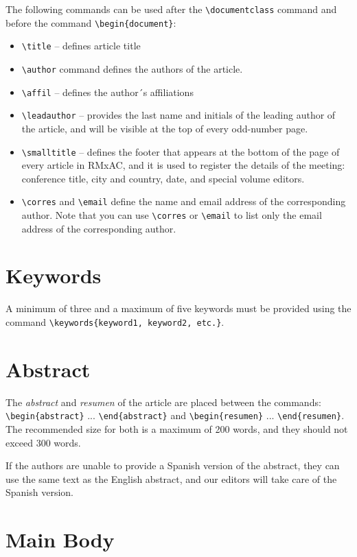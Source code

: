 \documentclass[10pt,letter,twoside]{rmat-rho}
\newcommand{\CS}[1]{\texttt{\textbackslash #1}}
\begin{document}
The following commands can be used after the \CS{documentclass} command and before the command \CS{begin}\verb|{document}|: %

\begin{itemize}
    \item \CS{title} -- defines article title
    \item \CS{author} command defines the authors of the article.
    \item \CS{affil} -- defines the author´s affiliations
    \item \CS{leadauthor} -- provides the last name and initials of the leading author of the article, and will be visible at the top of every odd-number page.
    \item \CS{smalltitle} -- defines the footer that appears at the bottom of the page of every article in RMxAC, and it is used to register the details of the meeting: conference title, city and country, date, and special volume editors.
    \item \CS{corres} and \CS{email} define the name and email address of the corresponding author. Note that you can use \CS{corres} or \CS{email} to list only the email address of the corresponding author.
\end{itemize}

\section{Keywords}

A minimum of three and a maximum of five keywords must be provided using the command \verb|\keywords{keyword1, keyword2, etc.}|. 


\section{Abstract}

The {\it abstract} and {\it resumen} of the article are placed between the commands: \CS{begin}\verb|{abstract}| ... \CS{end}\verb|{abstract}| and \CS{begin}\verb|{resumen}| ... \CS{end}\verb|{resumen}|. The recommended size for both is a maximum of 200 words, and they should not exceed 300 words.

If the authors are unable to provide a Spanish version of the abstract, they can use the same text as the English abstract, and our editors will take care of the Spanish version.
 



\section{Main Body}
\end{document}
